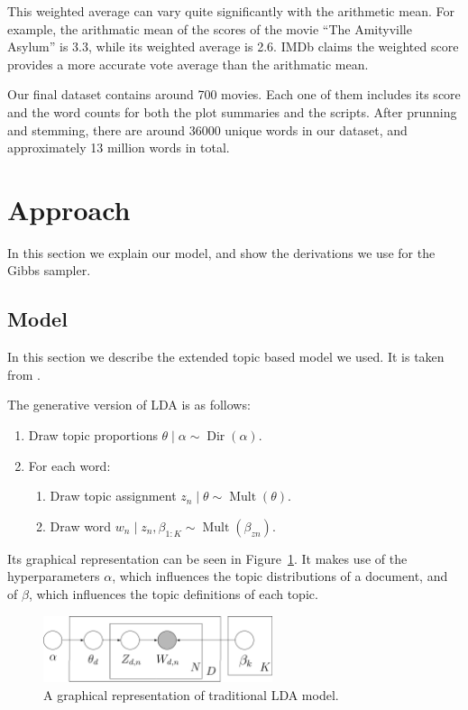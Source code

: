 \documentclass{article} %
\DeclareMathOperator{\Dir}{Dir}
\DeclareMathOperator{\Mult}{Mult}
\begin{document}
This weighted average can vary quite significantly with the arithmetic mean. 
For example, the arithmatic mean of the scores of the movie ``The Amityville Asylum'' is 3.3, while its weighted average is 2.6.
IMDb claims the weighted score provides a more accurate vote average than the arithmatic mean.

Our final dataset contains around 700 movies. Each one of them includes its score and the word counts for both the plot summaries and the scripts. After prunning and stemming, there are around 36000 unique words in our dataset, and approximately 13 million words in total.

\section{Approach}
\label{sec:approach}
In this section we explain our model, and show the derivations we use for the Gibbs sampler.

\subsection{Model}
In this section we describe the extended topic based model we used.
It is taken from \cite{SLDA}.

The generative version of LDA is as follows:
\begin{enumerate}
  \item Draw topic proportions $\theta \mid \alpha \sim \Dir(\alpha)$.
  \item For each word:
  \begin{enumerate}
    \item Draw topic assignment $z_n \mid \theta \sim \Mult(\theta)$.
    \item Draw word $w_n \mid z_n, \beta_{1:K} \sim \Mult(\beta_{zn})$.
  \end{enumerate}
\end{enumerate}
Its graphical representation can be seen in Figure~\ref{fig:LDA}.
It makes use of the hyperparameters $\alpha$, which influences the topic distributions of a document, and of $\beta$, which influences the topic definitions of each topic.

\begin{figure}[ht!]
  \centering
  \includegraphics[width=0.6\textwidth]{LDA.png}
  \caption{A graphical representation of traditional LDA model.}
  \label{fig:LDA}
\end{figure}
\end{document}
